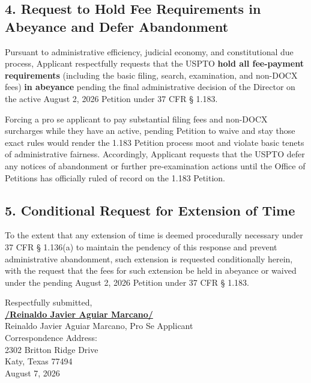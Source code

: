 \documentclass[11pt,letterpaper]{article}
\begin{document}
\subsection*{4. Request to Hold Fee Requirements in Abeyance and Defer Abandonment}

\noindent Pursuant to administrative efficiency, judicial economy, and constitutional due process, Applicant respectfully requests that the USPTO \textbf{hold all fee-payment requirements} (including the basic filing, search, examination, and non-DOCX fees) \textbf{in abeyance} pending the final administrative decision of the Director on the active August 2, 2026 Petition under 37 CFR \S{} 1.183.

\noindent Forcing a pro se applicant to pay substantial filing fees and non-DOCX surcharges while they have an active, pending Petition to waive and stay those exact rules would render the 1.183 Petition process moot and violate basic tenets of administrative fairness. Accordingly, Applicant requests that the USPTO defer any notices of abandonment or further pre-examination actions until the Office of Petitions has officially ruled of record on the 1.183 Petition.

\subsection*{5. Conditional Request for Extension of Time}

\noindent To the extent that any extension of time is deemed procedurally necessary under 37 CFR \S{} 1.136(a) to maintain the pendency of this response and prevent administrative abandonment, such extension is requested conditionally herein, with the request that the fees for such extension be held in abeyance or waived under the pending August 2, 2026 Petition under 37 CFR \S{} 1.183.

\vspace{1.0cm}
\begin{center}
    \singlespacing
    \small
    Respectfully submitted, \\
    \vspace{0.8cm}
    \underline{\textbf{/Reinaldo Javier Aguiar Marcano/}} \\
    Reinaldo Javier Aguiar Marcano, Pro Se Applicant \\
    Correspondence Address: \\
    2302 Britton Ridge Drive \\
    Katy, Texas 77494 \\
    August 7, 2026
\end{center}
\end{document}
